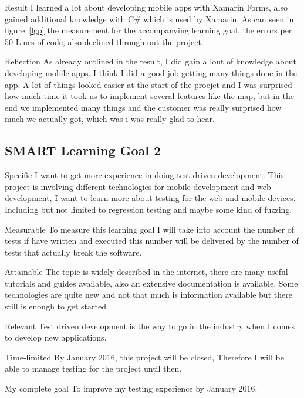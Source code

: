 \documentclass[12pt]{article}
\begin{document}
\begin{STAR}
     
    \item[Result] I learned a lot about developing mobile apps with Xamarin Forms, also gained additional knowledge with C\# which is used by Xamarin. As can seen in figure~\ref{lgp} the measurement for the accompanying learning goal, the errors per 50 Lines of code, also declined through out the project.
    \item[Reflection]
    As already outlined in the result, I did gain a lout of knowledge about developing mobile apps. I think I did a good job getting many things done in the app. A lot of things looked easier at the start of the proejct and I was surprised how much time it took us to implement several features like the map, but in the end we implemented many things and the customer was really surprised how much we actually got, which was i was really glad to hear. 
\end{STAR}

\clearpage

\subsection{SMART Learning Goal 2}
\begin{SMART}
    \item[Specific] I want to get more experience in doing test driven development. This project is involving different technologies for mobile development and web development, I want to learn more about testing for the web and mobile devices. Including but not limited to regression testing and maybe some kind of fuzzing.
    \item[Measurable] To measure this learning goal I will take into account the number of tests if have written and executed this number will be delivered by the number of tests that actually break the software.
    \item[Attainable] The topic is widely described in the internet, there are many useful tutorials and guides available, also an extensive documentation is available. Some technologies are quite new and not that much is information available but there still is enough to get started
    \item[Relevant] Test driven development is the way to go in the industry when I comes to develop new applications.
    \item[Time-limited] By January 2016, this project will be closed, Therefore I will be able to manage testing for the project until then.
    \item[My complete goal] To improve my testing  experience by January 2016.
\end{SMART}
\end{document}
